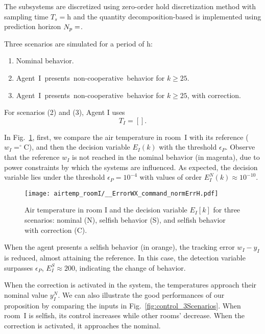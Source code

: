 \documentclass{ifacconf}  %
\begin{document}
The subsystems are discretized using zero-order hold discretization method with sampling time
${T_{s}=\mathrm{h}}$
and the quantity decomposition-based \dmpc{} is implemented using prediction horizon ${N_{p}=}$.

Three scenarios are simulated for a period of $\mathrm{h}$:

  \begin{enumerate}
    \item Nominal behavior.
    \item \mbox{Agent I presents non-cooperative behavior} for ${k\geq25}$.
    \item \mbox{Agent I presents non-cooperative behavior} for ${k\geq25}$, with correction.
  \end{enumerate}

  For scenarios (2) and (3), Agent I uses
  $$T_{I}=\left[\right].$$

In Fig.~\ref{fig:response3Scenarios}, first, we compare the air temperature in room~I
with its reference (${w_{I}=^{\circ}}$C), and then the
decision variable ${E_{I}(k)}$ with the threshold $\epsilon_{P}$.
Observe that the reference $w_{I}$ is not reached in the nominal behavior (in magenta),
due to power constraints by which the systems are influenced.
As expected, the decision variable lies under the threshold ${\epsilon_{P}=10^{-4}}$ with values of order ${E_{I}^{N}(k)\approx10^{-10}}$.
\begin{figure}[h]
  \centering
 \texttt{[image: airtemp\_roomI/\_\_ErrorWX\_command\_normErrH.pdf]}
  \caption{Air temperature in room I and the decision variable $E_{I}[k]$ for three scenarios: nominal (N), selfish behavior (S),
and selfish behavior with correction (C).}\label{fig:response3Scenarios}
\end{figure}

When the agent presents a selfish behavior (in orange), the tracking error
${w_{I}-y_{I}}$ is reduced, almost attaining the reference.
In this case, the detection variable surpasses $\epsilon_{P}$,
${E_{I}^{S}\approx200}$, indicating the change of behavior.

When the correction is activated in the system, the temperatures approach their nominal value $y_{I}^{N}$.
We can also illustrate the good performances of our proposition by comparing the inputs in Fig.~\ref{fig:control_3Scenarios}.
When room~I is selfish, its control increases while other rooms' decrease. When the correction is activated, it approaches the nominal.
\end{document}
